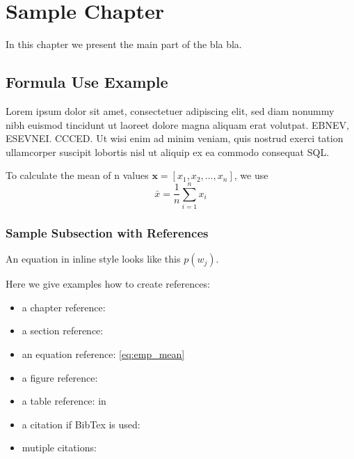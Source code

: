 \chapter{Sample Chapter}
\label{chp:sample_chapter}
In this chapter we present the main part of the bla bla.

\section{Formula Use Example}
\label{sec:forumla}
Lorem ipsum dolor sit amet, consectetuer adipiscing elit, sed diam nonummy nibh euismod tincidunt ut laoreet dolore magna aliquam erat volutpat. \ac{EBNEV}, \ac{ESEVNEI}. \ac{CCCED}. Ut wisi enim ad minim veniam, quis nostrud exerci tation ullamcorper suscipit lobortis nisl ut aliquip ex ea commodo consequat \ac{SQL}. 

To calculate the mean of n values $\mathbf{x} = [x_1, x_2, ..., x_n]$, we use
\begin{equation}
	\bar{x} = \frac{1}{n} \sum_{i=1}^{n}{x_i}
	\label{eq:emp_mean}
\end{equation}


\subsection{Sample Subsection with References}
\label{sec:sample_subsection}
An equation in inline style looks like this $p(w_j)$.

Here we give examples how to create references:
\begin{itemize}
	\item a chapter reference: 
	\item a section reference: 
	\item an equation reference: \eqref{eq:emp_mean}
	\item a figure reference: 
	\item a table reference:  in 
	\item a citation if BibTex is used: \cite{Iwata07}
	\item mutiple citations: \cite{Su07,Feasel08}
\end{itemize}


